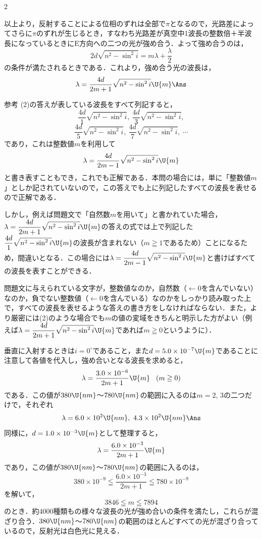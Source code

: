 \begin{multicols}{2}
\begin{komon}
       以上より，反射することによる位相のずれは全部で$\pi$となるので，光路差によってさらに$\pi$のずれが生じるとき，すなわち光路差が真空中1波長の整数倍＋半波長になっているときに$\mathrm{E}$方向への二つの光が強め合う．よって強め合うのは，
       \[2d\sqrt{n^2-\sin^2 i}=m\lambda+\frac{\lambda}{2}\]
       の条件が満たされるときである．これより，強め合う光の波長は，
       \[\lambda=\frac{4d}{2m+1}\sqrt{n^2-\sin^2 i}\U{m}\Ans\]
       \begin{bsHosoku}{参考}
       (2)の答えが表している波長をすべて列記すると，
       \[\frac{4d}{1}\sqrt{n^2-\sin^2 i},\ \frac{4d}{3}\sqrt{n^2-\sin^2 i},\]
       \[\frac{4d}{5}\sqrt{n^2-\sin^2 i},\ \frac{4d}{7}\sqrt{n^2-\sin^2 i},\ \cdots\]
       であり，これは整数値$m$を利用して
       \[\lambda=\frac{4d}{2m-1}\sqrt{n^2-\sin^2 i}\U{m}\]
       と書き表すこともでき，これでも正解である．本問の場合には，単に「整数値$m$」としか記されていないので，この答えでも上に列記したすべての波長を表せるので正解である．

       しかし，例えば問題文で「自然数$m$を用いて」と書かれていた場合，$\lambda=\dfrac{4d}{2m+1}\sqrt{n^2-\sin^2 i}\U{m}$の答えの式では上で列記した$\dfrac{4d}{1}\sqrt{n^2-\sin^2 i}\U{m}$の波長が含まれない（$m\geqq 1$であるため）ことになるため，間違いとなる．この場合には$\lambda=\dfrac{4d}{2m-1}\sqrt{n^2-\sin^2 i}\U{m}$と書けばすべての波長を表すことができる．

       問題文に与えられている文字が，整数値なのか，自然数（$\leftarrow$0を含んでいない）なのか，負でない整数値（$\leftarrow$0を含んでいる）なのかをしっかり読み取った上で，すべての波長を表せるような答えの書き方をしなければならない．また，より厳密には(2)のような場合でも$m$の値の変域をきちんと明示した方がよい（例えば$\lambda=\dfrac{4d}{2m+1}\sqrt{n^2-\sin^2 i}\U{m}$であれば$m\geqq 0$というように）．
       \end{bsHosoku}
 垂直に入射するときは$i=0^\circ$であること，また$d=5.0\times 10^{-7}\U{m}$であることに注意して各値を代入し，強め合いとなる波長を求めると，
       \[\lambda=\frac{3.0\times 10^{-6}}{2m+1}\U{m}\hspace{3mm}(m\geqq 0)\]
       である．この値が$380\U{nm}$〜$780\U{nm}$の範囲に入るのは$m=2$, 3の二つだけで，それぞれ
       \[\lambda=6.0\times 10^2\U{nm},\ 4.3\times 10^2\U{nm}\Ans\]
 同様に，$d=1.0\times 10^{-3}\U{m}$として整理すると，
       \[\lambda=\frac{6.0\times 10^{-3}}{2m+1}\U{m}\]
       であり，この値が$380\U{nm}$〜$780\U{nm}$の範囲に入るのは，
       \[380\times 10^{-9}\leqq\frac{6.0\times 10^{-3}}{2m+1}\leqq 780\times 10^{-9}\]
       を解いて，
       \[3846\leqq m\leqq 7894\]
       のとき．約4000種類もの様々な波長の光が強め合いの条件を満たし，これらが混ざり合う．$380\U{nm}$〜$780\U{nm}$の範囲のほとんどすべての光が混ざり合っているので，反射光は{\gtfamily 白色光に見える．}\hspace*{\fill}\Ans
\end{komon}


\end{multicols}
